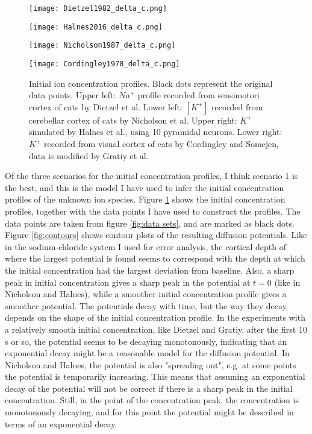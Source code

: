 \documentclass{article}
\begin{document}
\begin{figure}[!tbp]
  \centering
  \begin{minipage}[b]{0.45\textwidth}
    \texttt{[image: Dietzel1982\_delta\_c.png]}
  \end{minipage}
  \hfill
  \begin{minipage}[b]{0.45\textwidth}
    \texttt{[image: Halnes2016\_delta\_c.png]}
  \end{minipage}
    \begin{minipage}[b]{0.45\textwidth}
    \texttt{[image: Nicholson1987\_delta\_c.png]}
  \end{minipage}
  \hfill
  \begin{minipage}[b]{0.45\textwidth}
    \texttt{[image: Cordingley1978\_delta\_c.png]}
  \end{minipage}
  \caption{Initial ion concentration profiles. Black dots represent the original data points. Upper left: $Na^+$ profile recorded from sensimotori cortex of cats by Dietzel et al. Lower left: $[K^+]$  recorded from cerebellar cortex of cats by Nicholson et al. Upper right:  $K^+$ simulated by Halnes et al., using 10 pyramidal neurons. Lower right: $K^+$ recorded from visual cortex of cats by Cordingley and Somejen, data is modified by Gratiy et al.}
  \label{fig:initial concentrations}
\end{figure} 
Of the three scenarios for the initial concentration profiles, I think scenario 1 is the best, and this is the model I have used to infer the initial concentration profiles of the unknown ion species. Figure \ref{fig:initial concentrations} shows the initial concentration profiles, together with the data points I have used to construct the profiles. The data points are taken from figure \ref{fig:data sets}, and are marked as black dots. Figure \ref{fig:contours} shows contour plots of the resulting diffusion potentials. Like in the sodium-chloride system I used for error analysis, the cortical depth of where the largest potential is found seems to correspond with the depth at which the initial concentration had the largest deviation from baseline. Also, a sharp peak in initial concentration gives a sharp peak in the potential at $t=0$ (like in Nicholson and Halnes), while a smoother initial concentration profile gives a smoother potential. The potentials decay with time, but the way they decay depends on the shape of the initial concentration profile. In the experiments with a relatively smooth initial concentration, like Dietzel and Gratiy, after the first 10 s or so, the potential seems to be decaying monotonously, indicating that an exponential decay might be a reasonable model for the diffusion potential. In Nicholson and Halnes, the potential is also "spreading out", e.g. at some points the potential is temporarily increasing. This means that assuming an exponential decay of the potential will not be correct if there is a sharp peak in the initial concentration. Still, in the point of the concentration peak, the concentration is monotonously decaying, and for this point the potential might be described in terms of an exponential decay. 
\end{document}
